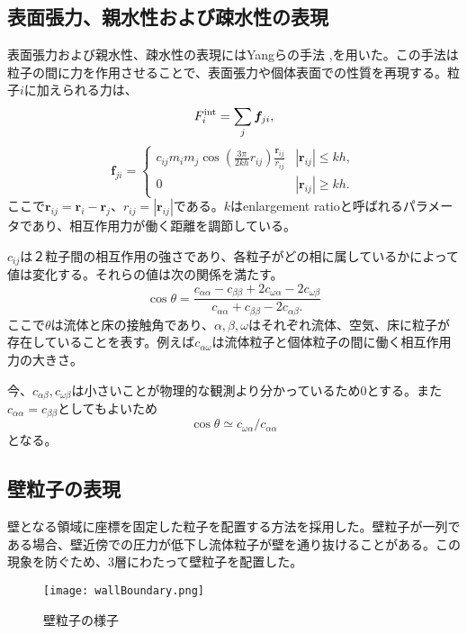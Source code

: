 \documentclass[]{jsarticle}
\begin{document}
\subsection{表面張力、親水性および疎水性の表現}
表面張力および親水性、疎水性の表現にはYangらの手法 \cite{Yang2016},\cite{Yang2017}を用いた。この手法は粒子の間に力を作用させることで、表面張力や個体表面での性質を再現する。粒子$i$に加えられる力は、
\begin{equation}
F^{\rm{int}}_i=\sum_{j} \bm{f}_{ji},
\end{equation}
\begin{equation}
  \bm{f}_{ji}=\begin{cases}
    c_{ij}m_im_j\cos\left(\frac{3\pi}{2kh}r_{ij}\right)\frac{\bm{r}_{ij}}{r_{ij}} & \text{$|\bm{r}_{ij}|\leq kh,$}\\
    0 & \text{$|\bm{r}_{ij}|\geq kh.$}
\end{cases}
\end{equation}
ここで$\bm{r}_{ij}=\bm{r}_i-\bm{r}_{j}$、$r_{ij}=|\bm{r}_{ij}|$である。$k$はenlargement ratioと呼ばれるパラメータであり、相互作用力が働く距離を調節している。

$c_{ij}$は２粒子間の相互作用の強さであり、各粒子がどの相に属しているかによって値は変化する。それらの値は次の関係を満たす。
\begin{equation}
\cos\theta=\frac{c_{\alpha\alpha}-c_{\beta\beta}+2c_{\omega\alpha}-2c_{\omega\beta}}{c_{\alpha\alpha} +c_{\beta\beta} -2c_{\alpha\beta}.}
\end{equation}
ここで$\theta$は流体と床の接触角であり、$\alpha,\beta,\omega$はそれぞれ流体、空気、床に粒子が存在していることを表す。例えば$c_{\alpha\omega}$は流体粒子と個体粒子の間に働く相互作用力の大きさ。

今、$c_{\alpha\beta},c_{\omega\beta}$は小さいことが物理的な観測より分かっているため0とする。また$c_{\alpha\alpha}=c_{\beta\beta}$としてもよいため
\begin{equation}
\label{eqn:contactAngleSimplified}
  \cos\theta\simeq c_{\omega\alpha}/c_{\alpha\alpha}
\end{equation}
となる。

\subsection{壁粒子の表現}
壁となる領域に座標を固定した粒子を配置する方法を採用した。壁粒子が一列である場合、壁近傍での圧力が低下し流体粒子が壁を通り抜けることがある。この現象を防ぐため、3層にわたって壁粒子を配置した。
\begin{figure}[H]
  \centering
  \texttt{[image: wallBoundary.png]}
  \caption{壁粒子の様子}
  \label{fig:wallParticles} 
\end{figure}
\end{document}
